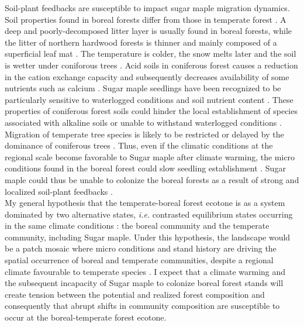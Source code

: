 Soil-plant feedbacks are susceptible to impact sugar maple migration dynamics.
Soil properties found in boreal forests differ from those in temperate forest
\cite{Lafleur2010,Barras1998,Goldblum2010,Demers1998}. A deep and poorly-decomposed  
litter layer is usually found in boreal forests, while the litter
of  northern hardwood forests is thinner and mainly composed of a superficial
leaf mat \cite{Barras1998}. The temperature is colder, the snow melts later
and the soil is wetter under coniforous trees \cite{Lafleur2010,Goldblum2010}.
Acid soils in coniferous forest causes a reduction in the cation exchange
capacity and subsequently decreases availability of some nutrients such as
calcium \cite{Moore2008}. Sugar maple seedlings have been recognized to be
particularly sensitive to waterlogged conditions and soil nutrient content
\cite{Moore2008,Lafleur2010,Cleavitt2011}. These properties of coniferous
forest soils could hinder the local establishment of species associated with
alkaline soils or unable to withstand waterlogged conditions
\cite{Lafleur2010}. Migration of temperate tree species is likely to be
restricted or delayed by the dominance of coniferous trees \cite{Lafleur2010}.
Thus, even if the climatic conditions at the regional scale become favorable
to Sugar maple after climate warming, the micro conditions found in the boreal
forest could slow seedling establishment
\cite{Kellman2004,Moore2008,Barras1998,Messier2011}. Sugar maple could thus be
unable to colonize the boreal forests as a result of strong and localized
soil-plant feedbacks \cite{McCarthyNeumann2012}.\\

My general hypothesis that the temperate-boreal forest ecotone is as a system
dominated by two alternative states, \textit{i.e.} contrasted equilibrium
states occurring in the same climate conditions \cite{scheffer2009critical}:
the boreal community and the temperate community, including Sugar maple. Under
this hypothesis, the landscape would be a patch mosaic where micro conditions
and stand history are driving the spatial occurrence of boreal and temperate
communities, despite a regional climate favourable to temperate species
\cite{Goldblum2010,Fisichelli2013}. I expect that a climate warming and the
subsequent incapacity of Sugar maple to colonize boreal forest stands will
create  tension between the potential and realized forest composition and
consequently that abrupt shifts in community composition are susceptible to
occur at the boreal-temperate forest ecotone.\\

